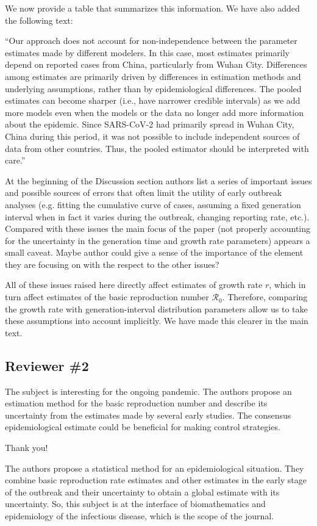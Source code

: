 \documentclass[12pt]{article}
\newcommand{\Ro}{\ensuremath{{\mathcal R}_{0}}\xspace}
\newcommand{\rev}{\subsection*}
\newcommand{\revtext}{\textsf}
\begin{document}
We now provide a table that summarizes this information. We have also added the following text:

``Our approach does not account for non-independence between the parameter estimates made by different modelers.
In this case, most estimates primarily depend on reported cases from China, particularly from Wuhan City.
Differences among estimates are primarily driven by differences in estimation methods and underlying assumptions, rather than by epidemiological differences.
The pooled estimates can become sharper (i.e., have narrower credible intervals) as we add more models even when the models or the data no longer add more information about the epidemic.
Since SARS-CoV-2 had primarily spread in Wuhan City, China during this period, it was not possible to include independent sources of data from other countries.
Thus, the pooled estimator should be interpreted with care.''

\revtext{
At the beginning of the Discussion section authors list a series of important issues and possible sources of errors that often limit the utility of early outbreak analyses (e.g. fitting the cumulative curve of cases, assuming a fixed generation interval when in fact it varies during the outbreak, changing reporting rate, etc.). Compared with these issues the main focus of the paper (not properly accounting for the uncertainty in the generation time and growth rate parameters) appears a small caveat. Maybe author could give a sense of the importance of the element they are focusing on with the respect to the other issues?}

All of these issues raised here directly affect estimates of growth rate $r$, which in turn affect estimates of the basic reproduction number \Ro.
Therefore, comparing the growth rate with generation-interval distribution parameters allow us to take these assumptions into account implicitly. We have made this clearer in the main text.

\rev{Reviewer \#2}

\revtext{The subject is interesting for the ongoing pandemic. The authors propose an estimation method
for the basic reproduction number and describe its uncertainty from the estimates made by
several early studies. The consensus epidemiological estimate could be beneficial for making
control strategies.}

Thank you!

\revtext{The authors propose a statistical method for an epidemiological situation. They combine basic
reproduction rate estimates and other estimates in the early stage of the outbreak and their
uncertainty to obtain a global estimate with its uncertainty. So, this subject is at the interface of
biomathematics and epidemiology of the infectious disease, which is the scope of the journal.}
\end{document}
